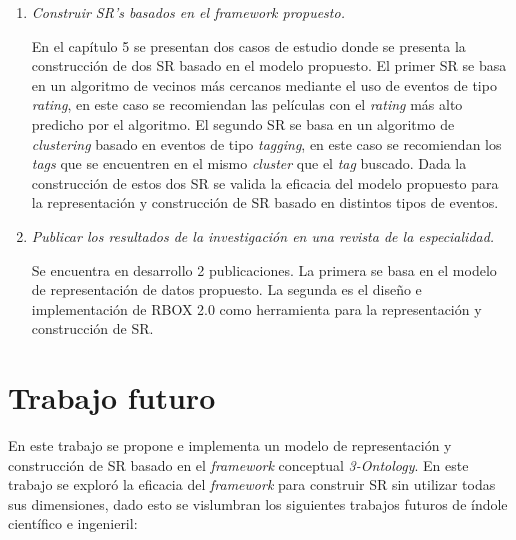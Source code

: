 \begin{enumerate}
	\item \textit{Construir SR’s basados en el \textit{framework} propuesto.}
	
	En el capítulo 5 se presentan dos casos de estudio donde se presenta la construcción de dos SR basado en el modelo propuesto. El primer SR se basa en un algoritmo de vecinos más cercanos mediante el uso de eventos de tipo \textit{rating}, en este caso se recomiendan las películas con el \textit{rating} más alto predicho por el algoritmo. El segundo SR se basa en un algoritmo de \textit{clustering} basado en eventos de tipo \textit{tagging}, en este caso se recomiendan los \textit{tags} que se encuentren en el mismo \textit{cluster} que el \textit{tag} buscado. Dada la construcción de estos dos SR se valida la eficacia del modelo propuesto para la representación y construcción de SR basado en distintos tipos de eventos.
	
	\item \textit{Publicar los resultados de la investigación en una revista de la especialidad.}
	
	Se encuentra en desarrollo 2 publicaciones. La primera se basa en el modelo de representación de datos propuesto. La segunda es el diseño e implementación de RBOX 2.0 como herramienta para la representación y construcción de SR.
	
	
\end{enumerate}

\section{Trabajo futuro}

En este trabajo se propone e implementa un modelo de representación y construcción de SR basado en el \textit{framework} conceptual \textit{3-Ontology}. En este trabajo se exploró la eficacia del \textit{framework} para construir SR sin utilizar todas sus dimensiones, dado esto se vislumbran los siguientes trabajos futuros de índole científico e ingenieril:

